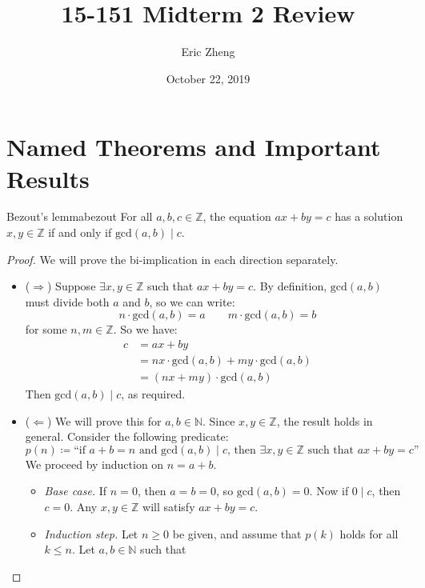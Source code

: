 \documentclass{article}
\title{15-151 Midterm 2 Review}
\author{Eric Zheng}
\date{October 22, 2019}
\theoremstyle{definition}
\def\gcd{\textrm{gcd}}
\def\divides{\mid}
\begin{document}
\maketitle

\section{Named Theorems and Important Results}
\begin{theorem}{Bezout's lemma}{bezout}
  For all $a,b,c \in \mathbb{Z}$, the equation $ax+by=c$ has a solution
  $x,y \in \mathbb{Z}$ if and only if $\gcd(a,b) \divides c$.
\end{theorem}
\begin{proof}
  We will prove the bi-implication in each direction separately.
  \begin{itemize}
    \item ($\Longrightarrow$) Suppose $\exists x,y \in \mathbb{Z}$ such that
      $ax+by=c$. By definition, $\gcd(a,b)$ must divide both $a$ and $b$, so
      we can write:
    \begin{equation*}
      n\cdot\gcd(a,b) = a \quad\quad m\cdot\gcd(a,b) = b
    \end{equation*}
    for some $n,m \in \mathbb{Z}$. So we have:
    \begin{align*}
      c &= ax+by                               \\
        &= nx\cdot\gcd(a,b) + my\cdot\gcd(a,b) \\
        &= (nx+my)\cdot\gcd(a,b)
    \end{align*}
    Then $\gcd(a,b) \divides c$, as required.
  \item ($\Longleftarrow$) We will prove this for $a,b \in \mathbb{N}$. Since
    $x,y \in \mathbb{Z}$, the result holds in general. Consider the following
    predicate:
    \begin{equation*}
      p(n) \coloneqq \textrm{``if $a+b=n$ and $\gcd(a,b) \divides c$, then
        $\exists x,y \in \mathbb{Z}$ such that $ax+by=c$''}
    \end{equation*}
    We proceed by induction on $n=a+b$.
    \begin{itemize}
      \item \textit{Base case.} If $n=0$, then $a=b=0$, so $\gcd(a,b)=0$. Now
        if $0 \divides c$, then $c=0$. Any $x,y \in \mathbb{Z}$ will satisfy
        $ax+by=c$.
      \item \textit{Induction step.} Let $n \ge 0$ be given, and assume that
        $p(k)$ holds for all $k \le n$. Let $a,b \in \mathbb{N}$ such that

\end{itemize}
\end{itemize}
\end{proof}
\end{document}
